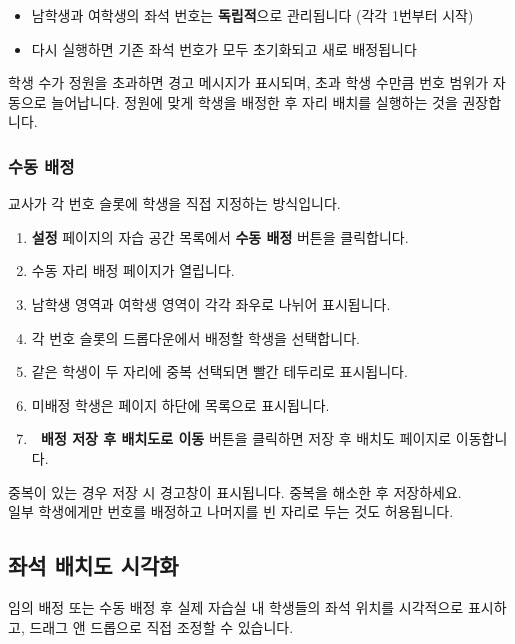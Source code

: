 \documentclass[a4paper,12pt]{article}
\newcommand{\menu}[1]{\textcolor{primary}{\textbf{#1}}}
\begin{document}
\begin{itemize}[leftmargin=1.5em]
    \item 남학생과 여학생의 좌석 번호는 \textbf{독립적}으로 관리됩니다 (각각 1번부터 시작)
    \item 다시 실행하면 기존 좌석 번호가 모두 초기화되고 새로 배정됩니다
\end{itemize}

\begin{warnbox}
  학생 수가 정원을 초과하면 경고 메시지가 표시되며, 초과 학생 수만큼 번호 범위가 자동으로 늘어납니다.
  정원에 맞게 학생을 배정한 후 자리 배치를 실행하는 것을 권장합니다.
\end{warnbox}

\subsubsection{수동 배정}

교사가 각 번호 슬롯에 학생을 직접 지정하는 방식입니다.

\begin{enumerate}[leftmargin=1.5em]
    \item \menu{설정} 페이지의 자습 공간 목록에서 \menu{수동 배정} 버튼을 클릭합니다.
    \item 수동 자리 배정 페이지가 열립니다.
    \item 남학생 영역과 여학생 영역이 각각 좌우로 나뉘어 표시됩니다.
    \item 각 번호 슬롯의 드롭다운에서 배정할 학생을 선택합니다.
    \item 같은 학생이 두 자리에 중복 선택되면 빨간 테두리로 표시됩니다.
    \item 미배정 학생은 페이지 하단에 목록으로 표시됩니다.
    \item \menu{💾 배정 저장 후 배치도로 이동} 버튼을 클릭하면 저장 후 배치도 페이지로 이동합니다.
\end{enumerate}

\begin{notebox}
  중복이 있는 경우 저장 시 경고창이 표시됩니다. 중복을 해소한 후 저장하세요.\\
  일부 학생에게만 번호를 배정하고 나머지를 빈 자리로 두는 것도 허용됩니다.
\end{notebox}

\subsection{좌석 배치도 시각화}

임의 배정 또는 수동 배정 후 실제 자습실 내 학생들의 좌석 위치를 시각적으로 표시하고, 드래그 앤 드롭으로 직접 조정할 수 있습니다.
\end{document}
